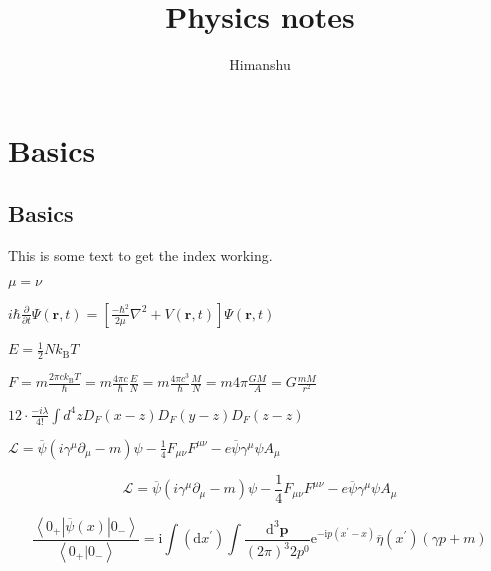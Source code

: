 \documentclass[11pt,a4paper]{book}
\author{Himanshu}
\title{Physics notes}
\begin{document}
\maketitle
\tableofcontents

	
\chapter{Basics}
\section{Basics}
This is some text to get the index working.


$\mu = \nu$
	
$	i\hbar {\frac {\partial }{\partial t}}\Psi (\mathbf {r} ,t)=\left[{\frac {-\hbar ^{2}}{2\mu }}\nabla ^{2}+V(\mathbf {r} ,t)\right]\Psi (\mathbf {r} ,t)$

$E = \frac { 1 } { 2 } N k _ { \mathrm { B } } T$

$F = m \frac { 2 \pi c k _ { \mathrm { B } } T } { \hbar } = m \frac { 4 \pi c } { \hbar } \frac { E } { N } = m \frac { 4 \pi c ^ { 3 } } { \hbar } \frac { M } { N } = m 4 \pi \frac { G M } { A } = G \frac { m M } { r ^ { 2 } }$

$12 \cdot \frac { - i \lambda } { 4 ! } \int d ^ { 4 } z D _ { F } ( x - z ) D _ { F } ( y - z ) D _ { F } ( z - z )$


$\mathcal { L } = \overline { \psi } \left( i \gamma ^ { \mu } \partial _ { \mu } - m \right) \psi - \frac { 1 } { 4 } F _ { \mu \nu } F ^ { \mu \nu } - e \overline { \psi } \gamma ^ { \mu } \psi A _ { \mu }$


\begin{equation}
    \mathcal { L } = \overline { \psi } \left( i \gamma ^ { \mu } \partial _ { \mu } - m \right) \psi - \frac { 1 } { 4 } F _ { \mu \nu } F ^ { \mu \nu } - e \overline { \psi } \gamma ^ { \mu } \psi A _ { \mu }
\end{equation}


\begin{equation}
    \frac { \left\langle 0 _ { + } | \overline { \psi } ( x ) | 0 _ { - } \right\rangle } { \left\langle 0 _ { + } | 0 _ { - } \right\rangle } = \mathrm { i } \int \left( \mathrm { d } x ^ { \prime } \right) \int \frac { \mathrm { d } ^ { 3 } \mathbf { p } } { ( 2 \pi ) ^ { 3 } 2 p ^ { 0 } } \mathrm { e } ^ { - \mathrm { i } p \left( x ^ { \prime } - x \right) } \overline { \eta } \left( x ^ { \prime } \right) ( \gamma p + m )
\end{equation}
\end{document}
